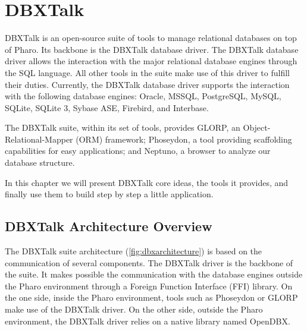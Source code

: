 \documentclass[a4paper,10pt,twoside]{book}
\begin{document}
\fi
\sloppy


\chapter{DBXTalk}
\chapterauthor{\authorguillep{}}

DBXTalk is an open-source suite of tools to manage relational databases on top of Pharo. Its backbone is the DBXTalk database driver. The DBXTalk database driver allows the interaction with the major relational database engines through the SQL language. All other tools in the suite make use of this driver to fulfill their duties.  Currently, the DBXTalk database driver supports the interaction with the following database engines: Oracle, MSSQL, PostgreSQL, MySQL, SQLite, SQLite 3, Sybase ASE, Firebird, and Interbase.

The DBXTalk suite, within its set of tools, provides GLORP, an Object-Relational-Mapper (ORM) framework; Phoseydon, a tool providing scaffolding capabilities for easy applications; and Neptuno, a browser to analyze our database structure. 

In this chapter we will present DBXTalk core ideas, the tools it provides, and finally use them to build step by step a little application.

\section{DBXTalk Architecture Overview}
The DBXTalk suite architecture (\autoref{fig:dbxarchitecture}) is based on the communication of several components. The DBXTalk driver is the backbone of the suite. It makes possible the communication with the database engines outside the Pharo environment through a Foreign Function Interface (FFI) library. On the one side, inside the Pharo environment, tools such as Phoseydon or GLORP make use of the DBXTalk driver. On the other side, outside the  Pharo environment, the DBXTalk driver relies on a native library named OpenDBX.
\end{document}
